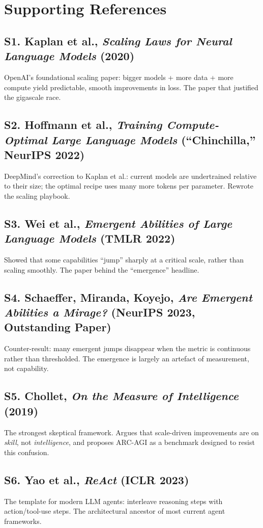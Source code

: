 \documentclass[11pt,a4paper]{article}
\begin{document}
\section*{Supporting References}

\subsection*{S1. Kaplan et al., \emph{Scaling Laws for Neural Language Models}
(2020)}
OpenAI's foundational scaling paper: bigger models + more data + more
compute yield predictable, smooth improvements in loss. The paper that
justified the gigascale race.

\subsection*{S2. Hoffmann et al., \emph{Training Compute-Optimal Large
Language Models} (``Chinchilla,'' NeurIPS 2022)}
DeepMind's correction to Kaplan et al.: current models are undertrained
relative to their size; the optimal recipe uses many more tokens per
parameter. Rewrote the scaling playbook.

\subsection*{S3. Wei et al., \emph{Emergent Abilities of Large Language Models}
(TMLR 2022)}
Showed that some capabilities ``jump'' sharply at a critical scale,
rather than scaling smoothly. The paper behind the ``emergence'' headline.

\subsection*{S4. Schaeffer, Miranda, Koyejo, \emph{Are Emergent Abilities a
Mirage?} (NeurIPS 2023, Outstanding Paper)}
Counter-result: many emergent jumps disappear when the metric is
continuous rather than thresholded. The emergence is largely an artefact
of measurement, not capability.

\subsection*{S5. Chollet, \emph{On the Measure of Intelligence} (2019)}
The strongest skeptical framework. Argues that scale-driven improvements
are on \emph{skill}, not \emph{intelligence}, and proposes ARC-AGI as a
benchmark designed to resist this confusion.

\subsection*{S6. Yao et al., \emph{ReAct} (ICLR 2023)}
The template for modern LLM agents: interleave reasoning steps with
action/tool-use steps. The architectural ancestor of most current agent
frameworks.
\end{document}
